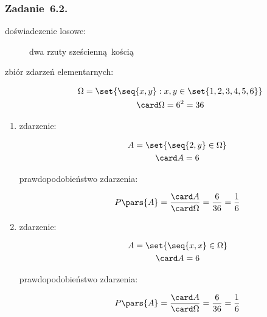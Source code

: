 \subsubsection*{Zadanie~6.2.}
\begin{description}
    \item[doświadczenie losowe:] dwa rzuty sześcienną kością
    \item[zbiór zdarzeń elementarnych:]
        \begin{gather*}
            \Omega = \set{\seq{x, y} : x, y \in \set{1, 2, 3, 4, 5, 6}}\\
            \card\Omega = 6^2 = 36
        \end{gather*}
\end{description}
\begin{enumerate}[label={\alph*)}]
    \item
        \begin{description}
            \item[zdarzenie:]
                \begin{gather*}
                    A = \set{\seq{2, y} \in \Omega}\\
                    \card A = 6
                \end{gather*}
            \item[prawdopodobieństwo zdarzenia:]
                \begin{equation*}
                    P\pars{A}
                        = \frac{\card A}{\card\Omega}
                        = \frac{6}{36}
                        = \frac{1}{6}
                \end{equation*}
        \end{description}
    \item
        \begin{description}
            \item[zdarzenie:]
                \begin{gather*}
                    A = \set{\seq{x, x} \in \Omega}\\
                    \card A = 6
                \end{gather*}
            \item[prawdopodobieństwo zdarzenia:]
                \begin{equation*}
                    P\pars{A}
                        = \frac{\card A}{\card\Omega}
                        = \frac{6}{36}
                        = \frac{1}{6}
                \end{equation*}

\end{description}
\end{enumerate}
